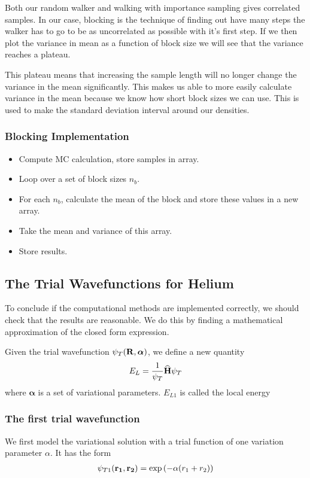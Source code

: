 \documentclass[twocolumn]{article}[10pt]
\newcommand{\eq}[1]{\begin{align*}#1\end{align*}}
\renewcommand\vec[1]{{\bf #1}}
\newcommand{\OP}[1]{{\bf\widehat{#1}}}
\begin{document}
Both our random walker and walking with importance sampling gives correlated
samples. In our case, blocking is the technique of finding out have many steps
the walker has to go to be as uncorrelated as possible with it's first step.
If we then plot the variance in mean as a function of block size we 
will see that the variance reaches a plateau. 

This plateau means that increasing the sample length will no longer
change the variance in the mean significantly. This makes us able to more easily calculate 
variance in the mean because we know how short block sizes we can use. 
This is used to make the standard deviation interval around our densities. 


\subsubsection{Blocking Implementation}

\begin{itemize}
    \item Compute MC calculation, store samples in array.
    \item Loop over a set of block sizes $n_b$.
    \item For each $n_b$, calculate the mean of the block
        and store these values in a new array.
    \item Take the mean and variance of this array.
    \item Store results.
\end{itemize}

\subsection{The Trial Wavefunctions for Helium}

To conclude if the computational methods are implemented correctly,
we should check that the results are reasonable. We do this by
finding a mathematical approximation of the closed form expression.

Given the trial wavefunction $\psi_T (\vec R, \boldsymbol\alpha)$, 
we define a new quantity
{\small
\eq{
  E_L = \frac{1}{\psi_T}\OP H \psi_T
}}%
where $\boldsymbol\alpha$ is a set of variational parameters.
$E_{L1}$ is called the local energy

\subsubsection{The first trial wavefunction}
We first model the variational solution with a trial function of one
variation parameter $\alpha$. It has the form
{\small
\eq{
\psi_{T1}({\bf r_1},{\bf r_2}) = 
   \exp{\left(-\alpha(r_1+r_2)\right)}
}}%
\end{document}
